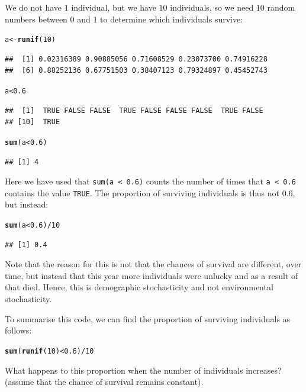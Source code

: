 \documentclass{article}\usepackage[]{graphicx}\usepackage[]{color}
\makeatletter
\newcommand{\hlnum}[1]{\textcolor[rgb]{0.686,0.059,0.569}{#1}}%
\newcommand{\hlopt}[1]{\textcolor[rgb]{0,0,0}{#1}}%
\newcommand{\hlstd}[1]{\textcolor[rgb]{0.345,0.345,0.345}{#1}}%
\newcommand{\hlkwb}[1]{\textcolor[rgb]{0.69,0.353,0.396}{#1}}%
\newcommand{\hlkwd}[1]{\textcolor[rgb]{0.737,0.353,0.396}{\textbf{#1}}}%
\newenvironment{kframe}{%
 \def\at@end@of@kframe{}%
 \ifinner\ifhmode%
  \def\at@end@of@kframe{\end{minipage}}%
  \begin{minipage}{\columnwidth}%
 \fi\fi%
 \def\FrameCommand##1{\hskip\@totalleftmargin \hskip-\fboxsep
 \colorbox{shadecolor}{##1}\hskip-\fboxsep
     \hskip-\linewidth \hskip-\@totalleftmargin \hskip\columnwidth}%
 \MakeFramed {\advance\hsize-\width
   \@totalleftmargin\z@ \linewidth\hsize
   \@setminipage}}%
 {\par\unskip\endMakeFramed%
 \at@end@of@kframe}
\newenvironment{knitrout}{}{} %
\makeatother
\begin{document}
We do not have $1$ individual, but we have $10$ individuals, so we need $10$ random numbers between $0$ and $1$ to determine which individuals survive:
\begin{knitrout}
\color{fgcolor}\begin{kframe}
\begin{alltt}
\hlstd{a} \hlkwb{<-} \hlkwd{runif}\hlstd{(}\hlnum{10}\hlstd{)}
\end{alltt}
\begin{verbatim}
##  [1] 0.02316389 0.90885056 0.71608529 0.23073700 0.74916228
##  [6] 0.88252136 0.67751503 0.38407123 0.79324897 0.45452743
\end{verbatim}
\begin{alltt}
\hlstd{a} \hlopt{<} \hlnum{0.6}
\end{alltt}
\begin{verbatim}
##  [1]  TRUE FALSE FALSE  TRUE FALSE FALSE FALSE  TRUE FALSE
## [10]  TRUE
\end{verbatim}
\begin{alltt}
\hlkwd{sum}\hlstd{(a} \hlopt{<} \hlnum{0.6}\hlstd{)}
\end{alltt}
\begin{verbatim}
## [1] 4
\end{verbatim}
\end{kframe}
\end{knitrout}
Here we have used that \texttt{sum(a < 0.6)} counts the number of times that \texttt{a < 0.6} contains the value \texttt{TRUE}.
The proportion of surviving individuals is thus not $0.6$, but instead:
\begin{knitrout}
\color{fgcolor}\begin{kframe}
\begin{alltt}
\hlkwd{sum}\hlstd{(a} \hlopt{<} \hlnum{0.6}\hlstd{)} \hlopt{/} \hlnum{10}
\end{alltt}
\begin{verbatim}
## [1] 0.4
\end{verbatim}
\end{kframe}
\end{knitrout}
Note that the reason for this is not that the chances of survival are different, over time, but instead that this year more individuals were unlucky and as a result of that died. Hence, this is demographic stochasticity and not environmental stochasticity.

To summarise this code, we can find the proportion of surviving individuals as follows:
\begin{knitrout}
\color{fgcolor}\begin{kframe}
\begin{alltt}
\hlkwd{sum}\hlstd{(} \hlkwd{runif}\hlstd{(}\hlnum{10}\hlstd{)} \hlopt{<} \hlnum{0.6}\hlstd{)} \hlopt{/} \hlnum{10}
\end{alltt}
\end{kframe}
\end{knitrout}
What happens to this proportion when the number of individuals increases? (assume that the chance of survival remains constant).
\end{document}
